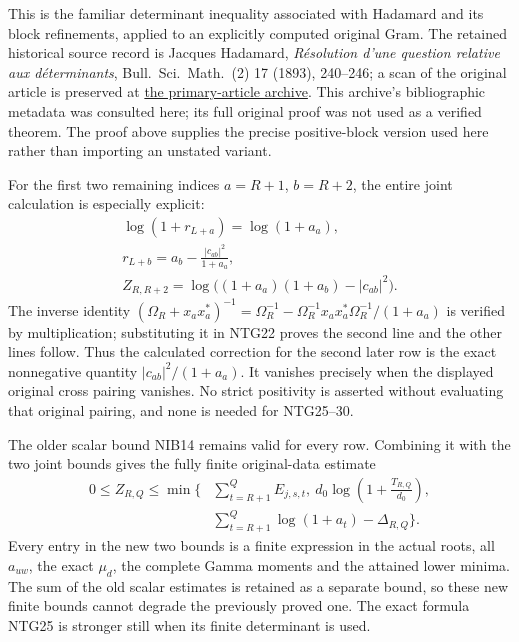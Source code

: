 This is the familiar determinant inequality associated with
Hadamard and its block refinements, applied to an explicitly
computed original Gram. The retained historical source record is
Jacques Hadamard, \emph{R\'esolution d'une question relative
aux d\'eterminants}, Bull.\ Sci.\ Math.\ (2) 17 (1893),
240--246; a scan of the original article is preserved at
\href{https://zenodo.org/records/18674602}{the primary-article archive}.
This archive's bibliographic metadata was consulted here;
its full original proof was not used as a verified theorem.
The proof above supplies the precise positive-block version
used here rather than importing an unstated variant.

For the first two remaining indices $a=R+1$, $b=R+2$,
the entire joint calculation is especially explicit:
\[
\begin{gathered}
 \log(1+r_{L+a})=\log(1+a_a),\\
 r_{L+b}=a_b-\frac{|c_{ab}|^2}{1+a_a},\\
 Z_{R,R+2}=\log\bigl((1+a_a)(1+a_b)-|c_{ab}|^2\bigr).
\end{gathered}                                                    \tag{NTG30}
\]
The inverse identity
$(\Omega_R+x_ax_a^*)^{-1}
=\Omega_R^{-1}
-\Omega_R^{-1}x_ax_a^*\Omega_R^{-1}/(1+a_a)$
is verified by multiplication; substituting it in
NTG22 proves the second line and the other lines follow.
Thus the calculated correction for the second later row
is the exact nonnegative quantity $|c_{ab}|^2/(1+a_a)$.
It vanishes precisely when the displayed original
cross pairing vanishes. No strict positivity is asserted
without evaluating that original pairing, and none is
needed for NTG25--30.

The older scalar bound NIB14 remains valid for every row.
Combining it with the two joint bounds gives the
fully finite original-data estimate
\[
\begin{split}
 0\le Z_{R,Q}\le \min\bigg\{&
 \sum_{t=R+1}^{Q}E_{j,s,t},\
 d_0\log\left(1+\frac{T_{R,Q}}{d_0}\right),\\
 &\sum_{t=R+1}^{Q}\log(1+a_t)-\Delta_{R,Q}\bigg\}.
\end{split}                                                      \tag{NTG31}
\]
Every entry in the new two bounds is a finite expression
in the actual roots, all $a_{uw}$, the exact $\mu_d$,
the complete Gamma moments and the attained lower minima.
The sum of the old scalar estimates is retained as a
separate bound, so these new finite bounds cannot degrade
the previously proved one. The exact formula NTG25
is stronger still when its finite determinant is used.

